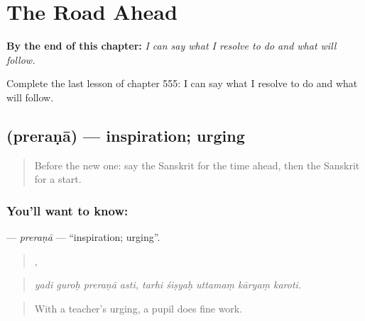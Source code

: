 
\chapter{The Road Ahead}
\label{ch:sa-the-road-ahead}

\begin{chapteropening}
\textbf{By the end of this chapter:} \emph{I can say what I resolve to do and what will follow.}

Complete the last lesson of chapter 555: I can say what I resolve to do and what will follow.
\end{chapteropening}

\section[\texorpdfstring{\sk{प्रेरणा} (preraṇā)}{प्रेरणा (preraṇā)}]{ (preraṇā) — inspiration; urging}

\label{lesson:SA-C555-prerana}



\begin{quote}
Before the new one: say the Sanskrit for the time ahead, then the Sanskrit for a start.
\end{quote}

\subsection*{You'll want to know: }
\textbf{} — \emph{preraṇā} — \textquotedblleft{}inspiration; urging\textquotedblright{}.

\begin{quote}
   ,     
\end{quote}

\begin{quote}
\emph{yadi guroḥ preraṇā asti, tarhi śiṣyaḥ uttamaṃ kāryaṃ karoti.}
\end{quote}

\begin{quote}
With a teacher's urging, a pupil does fine work.
\end{quote}

